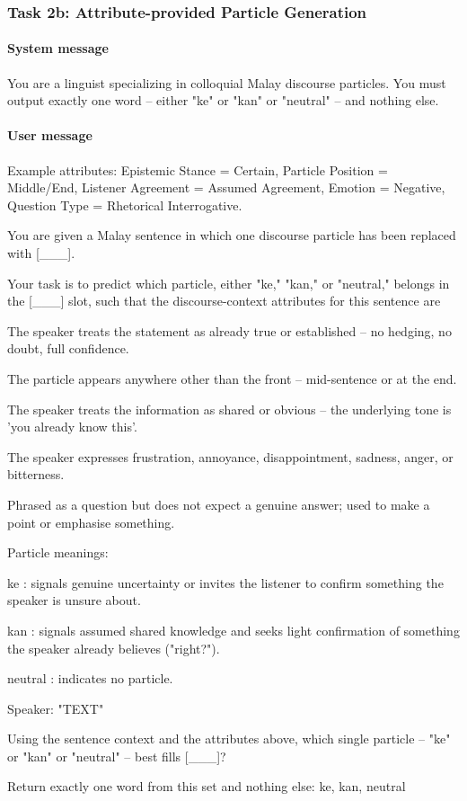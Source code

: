 \documentclass[11pt]{article}
\begin{document}
\subsubsection{Task 2b: Attribute-provided Particle Generation}

\paragraph{System message}
\begin{PromptBlock}
You are a linguist specializing in colloquial Malay discourse particles. You must output exactly one word -- either "ke" or "kan" or "neutral" -- and nothing else.
\end{PromptBlock}

\paragraph{User message}
Example attributes: Epistemic Stance = Certain, Particle Position = Middle/End, Listener Agreement = Assumed Agreement, Emotion = Negative, Question Type = Rhetorical Interrogative.

\begin{PromptBlock}
You are given a Malay sentence in which one discourse particle has been replaced with [\_\_\_].

Your task is to predict which particle, either "ke," "kan," or "neutral," belongs in the [\_\_\_] slot, such that the discourse-context attributes for this sentence are

The speaker treats the statement as already true or established -- no hedging, no doubt, full confidence.

The particle appears anywhere other than the front -- mid-sentence or at the end.

The speaker treats the information as shared or obvious -- the underlying tone is 'you already know this'.

The speaker expresses frustration, annoyance, disappointment, sadness, anger, or bitterness.

Phrased as a question but does not expect a genuine answer; used to make a point or emphasise something.

Particle meanings:

ke  : signals genuine uncertainty or invites the listener to confirm something the speaker is unsure about.

kan : signals assumed shared knowledge and seeks light confirmation of something the speaker already believes ("right?").

neutral : indicates no particle.

Speaker: "{TEXT}"

Using the sentence context and the attributes above, which single particle -- "ke" or "kan" or "neutral" -- best fills [\_\_\_]?

Return exactly one word from this set and nothing else: ke, kan, neutral
\end{PromptBlock}
\end{document}

